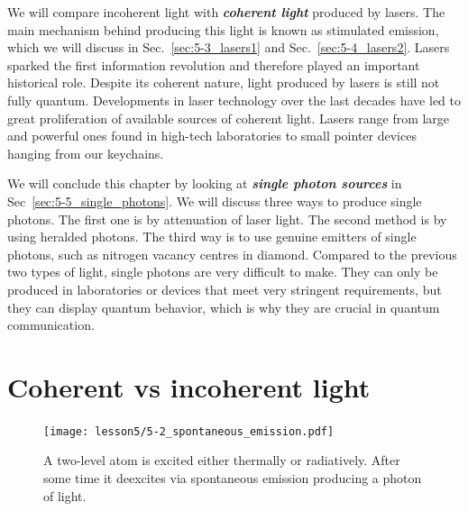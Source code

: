 We will compare incoherent light with \textit{\textbf{coherent light}} produced by lasers. The main mechanism behind producing this light is known as stimulated emission, which we will discuss in Sec.~\ref{sec:5-3_lasers1} and Sec.~\ref{sec:5-4_lasers2}.
Lasers sparked the first information revolution and therefore played an important historical role.
Despite its coherent nature, light produced by lasers is still not fully quantum. 
Developments in laser technology over the last decades have led to great proliferation of available sources of coherent light.
Lasers range from large and powerful ones found in high-tech laboratories to small pointer devices hanging from our keychains.

We will conclude this chapter by looking at \textit{\textbf{single photon sources}} in Sec~\ref{sec:5-5_single_photons}.
We will discuss three ways to produce single photons.
The first one is by attenuation of laser light.
The second method is by using heralded photons.
The third way is to use genuine emitters of single photons, such as nitrogen vacancy centres in diamond.
Compared to the previous two types of light, single photons are very difficult to make.
They can only be produced in laboratories or devices that meet very stringent requirements, but they can display quantum behavior, which is why they are crucial in quantum communication.



\section{Coherent vs incoherent light}
\label{sec:5-2_coherent_vs_incoherent}

\begin{figure}
    \centering
    \texttt{[image: lesson5/5-2\_spontaneous\_emission.pdf]}
    \caption[Spontaneous emission.]{A two-level atom is excited either thermally or radiatively. After some time it deexcites via spontaneous emission producing a photon of light.}
    \label{fig:5-2_spontaneous_emission}
\end{figure}

